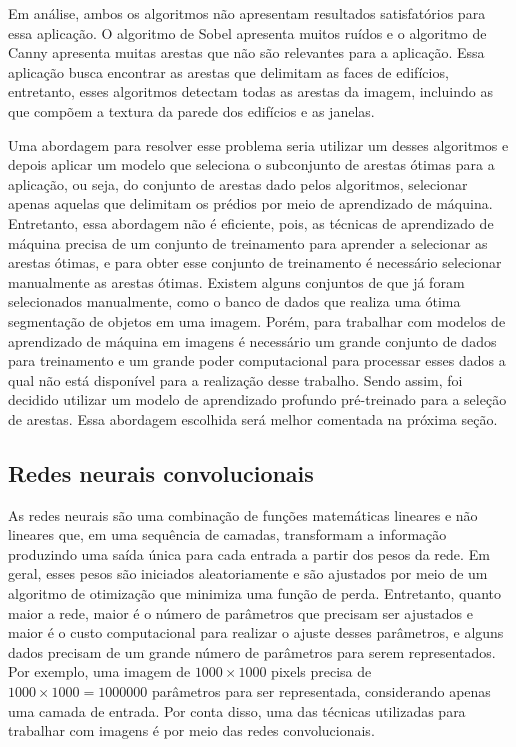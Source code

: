 \documentclass[12pt]{article}
\begin{document}
Em análise, ambos os algoritmos não apresentam resultados satisfatórios para essa aplicação. O algoritmo de Sobel apresenta muitos ruídos e o algoritmo de Canny apresenta muitas arestas que não são relevantes para a aplicação. Essa aplicação busca encontrar as arestas que delimitam as faces de edifícios, entretanto, esses algoritmos detectam todas as arestas da imagem, incluindo as que compõem a textura da parede dos edifícios e as janelas. 

Uma abordagem para resolver esse problema seria utilizar um desses algoritmos e depois aplicar um modelo que seleciona o subconjunto de arestas ótimas para a aplicação, ou seja, do conjunto de arestas dado pelos algoritmos, selecionar apenas aquelas que delimitam os prédios por meio de aprendizado de máquina. Entretanto, essa abordagem não é eficiente, pois, as técnicas de aprendizado de máquina precisa de um conjunto de treinamento para aprender a selecionar as arestas ótimas, e para obter esse conjunto de treinamento é necessário selecionar manualmente as arestas ótimas. Existem alguns conjuntos de que já foram selecionados manualmente, como o banco de dados \cite[Nyu Dataset]{nyu_depth_v2} que realiza uma ótima segmentação de objetos em uma imagem. Porém, para trabalhar com modelos de aprendizado de máquina em imagens é necessário um grande conjunto de dados para treinamento e um grande poder computacional para processar esses dados a qual não está disponível para a realização desse trabalho. Sendo assim, foi decidido utilizar um modelo de aprendizado profundo pré-treinado para a seleção de arestas. Essa abordagem escolhida será melhor comentada na próxima seção.

\subsection{Redes neurais convolucionais}

As redes neurais \cite{bishop2016pattern} são uma combinação de funções matemáticas lineares e não lineares que, em uma sequência de camadas, transformam a informação produzindo uma saída única para cada entrada a partir dos pesos da rede. Em geral, esses pesos são iniciados aleatoriamente e são ajustados por meio de um algoritmo de otimização que minimiza uma função de perda. Entretanto, quanto maior a rede, maior é o número de parâmetros que precisam ser ajustados e maior é o custo computacional para realizar o ajuste desses parâmetros, e alguns dados precisam de um grande número de parâmetros para serem representados. Por exemplo, uma imagem de $1000\times1000$ pixels precisa de $1000\times1000=1000000$ parâmetros para ser representada, considerando apenas uma camada de entrada. Por conta disso, uma das técnicas utilizadas para trabalhar com imagens é por meio das redes convolucionais.
\end{document}
